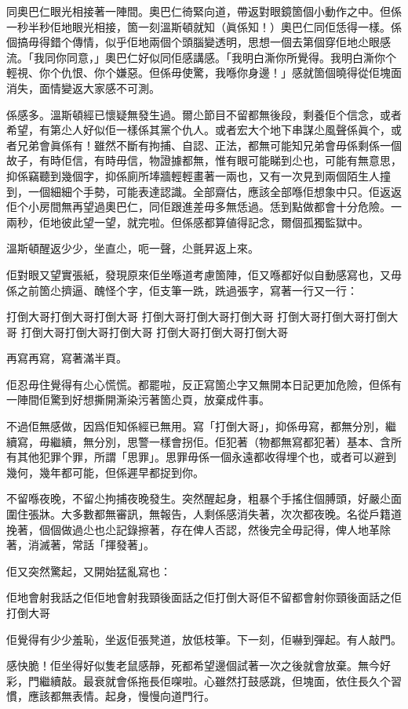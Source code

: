 同奧巴仁眼光相接著一陣間。奧巴仁徛緊向道，帶返對眼鏡箇個小動作之中。但係一秒半秒佢地眼光相接，箇一刻溫斯頓就知（眞係知！）奧巴仁同佢恁得一樣。係個搞毋得錯个傳情，似乎佢地兩個个頭腦變透明，思想一個去第個穿佢地尐眼感流。「我同你同意，」奧巴仁好似同佢感講感。「我明白澌你所覺得。我明白澌你个輕視、你个仇恨、你个嫌惡。但係毋使驚，我喺你身邊！」感就箇個曉得從佢塊面消失，面情變返大家感不可測。

係感多。溫斯頓經已懷疑無發生過。爾尐節目不留都無後段，剩養佢个信念，或者希望，有第尐人好似佢一樣係其黨个仇人。或者宏大个地下串謀尐風聲係眞个，或者兄弟會眞係有！雖然不斷有拘捕、自認、正法，都無可能知兄弟會毋係剩係一個故子，有時佢信，有時毋信，物證據都無，惟有眼可能睇到尐也，可能有無意思，抑係竊聽到幾個字，抑係廁所埲牆輕輕畫著一兩也，又有一次見到兩個陌生人撞到，一個細細个手勢，可能表達認識。全部齋估，應該全部喺佢想𧰼中只。佢返返佢个小房間無再望過奧巴仁，同佢跟進差毋多無恁過。恁到點做都會十分危險。一兩秒，佢地彼此望一望，就完啦。但係感都算値得記念，爾個孤獨監獄中。

溫斯頓醒返少少，坐直尐，呃一聲，尐氈昇返上來。

佢對眼又望實張紙，發現原來佢坐喺道考慮箇陣，佢又喺都好似自動感寫也，又毋係之前箇尐擠逼、醜怪个字，佢支筆一跣，跣過張字，寫著一行又一行：

	打倒大哥打倒大哥打倒大哥
	打倒大哥打倒大哥打倒大哥
	打倒大哥打倒大哥打倒大哥
	打倒大哥打倒大哥打倒大哥
	打倒大哥打倒大哥打倒大哥

再寫再寫，寫著滿半頁。

佢忍毋住覺得有尐心慌慌。都罷啦，反正寫箇尐字又無開本日記更加危險，但係有一陣間佢驚到好想撕開澌染污著箇尐頁，放棄成件事。

不過佢無感做，因爲佢知係經已無用。寫「打倒大哥」，抑係毋寫，都無分別，繼續寫，毋繼續，無分別，思警一樣會拐佢。佢犯著（物都無寫都犯著）基本、含所有其他犯罪个罪，所謂「思罪」。思罪毋係一個永遠都收得埋个也，或者可以避到幾何，幾年都可能，但係遲早都捉到你。

不留喺夜晚，不留尐拘捕夜晚發生。突然醒起身，粗暴个手搖住個膊頭，好嚴尐面圍住張牀。大多數都無審訊，無報告，人剩係感消失著，次次都夜晚。名從戶籍道挽著，個個做過尐也尐記錄擦著，存在俾人否認，然後完全毋記得，俾人地革除著，消滅著，常話「揮發著」。

佢又突然驚起，又開始猛亂寫也：

佢地會射我話之佢佢地會射我頸後面話之佢打倒大哥佢不留都會射你頸後面話之佢打倒大哥

佢覺得有少少羞恥，坐返佢張凳道，放低枝筆。下一刻，佢嚇到彈起。有人敲門。

感快脆！佢坐得好似隻老鼠感靜，死都希望邊個試著一次之後就會放棄。無今好彩，門繼續敲。最衰就會係拖長佢㗎啦。心雖然打鼓感跳，但塊面，依住長久个習慣，應該都無表情。起身，慢慢向道門行。

